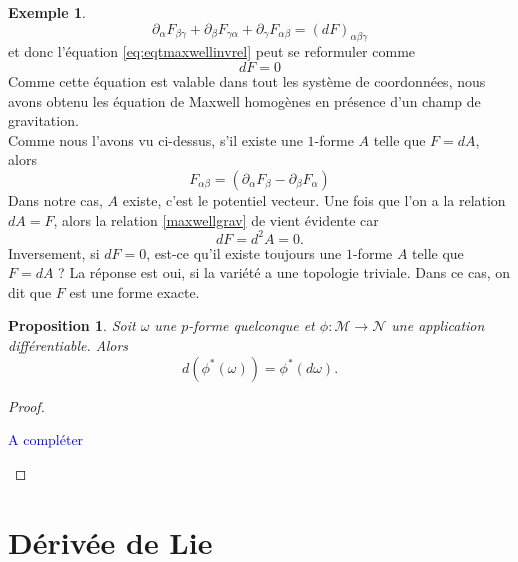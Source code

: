 \documentclass[a4paper,11pt]{report}
\theoremstyle{definition}
\theoremstyle{plain}
\newtheorem{prop}[thm]{Proposition}
\theoremstyle{definition}
\newtheorem{exmp}{Exemple}[chapter]
\theoremstyle{remark}
\newcommand{\comp}{\begin{center}\textcolor{blue}{A compléter}\end{center}}
\newcommand{\M}{\mathscr{M}}
\newcommand{\N}{\mathscr{N}}
\newcommand{\p}{\partial}
\begin{document}
\begin{exmp}
                \begin{equation}
                    \p_\alpha F_{\beta\gamma}+\p_\beta F_{\gamma\alpha}+\p_\gamma F_{\alpha\beta} = (dF)_{\alpha\beta\gamma}
                \end{equation}
                et donc l'équation \ref{eq:eqtmaxwellinvrel} peut se reformuler comme
                \begin{equation}\label{eq:maxwellgrav}
                    dF = 0
                \end{equation}
                Comme cette équation est valable dans tout les système de coordonnées, nous avons obtenu les équation de Maxwell homogènes en présence d'un champ de gravitation.\\
                
                Comme nous l'avons vu ci-dessus, s'il existe une $1$-forme $A$ telle que $F = dA$, alors
                \begin{equation}
                    F_{\alpha\beta} = (\p_\alpha F_\beta-\p_\beta F_\alpha)
                \end{equation}
                Dans notre cas, $A$ existe, c'est le potentiel vecteur. Une fois que l'on a la relation $dA = F$, alors la relation \ref{maxwellgrav} de vient évidente car
                \begin{equation}
                    dF = d^2A = 0.
                \end{equation}
                Inversement, si $dF = 0$, est-ce qu'il existe toujours une $1$-forme $A$ telle que $F = dA$ ? La réponse est oui, si la variété a une topologie triviale. Dans ce cas, on dit que $F$ est une forme exacte.
            \end{exmp}
            
            \begin{prop}
                Soit $\omega$ une $p$-forme quelconque et $\phi:\M\to\N$ une application différentiable. Alors
                \begin{equation}
                    d(\phi^*(\omega)) = \phi^*(d\omega).
                \end{equation}
            \end{prop}
            
            \begin{proof}${}$\\
                \comp
            \end{proof}
            
        \section{Dérivée de Lie}
            
\end{document}
